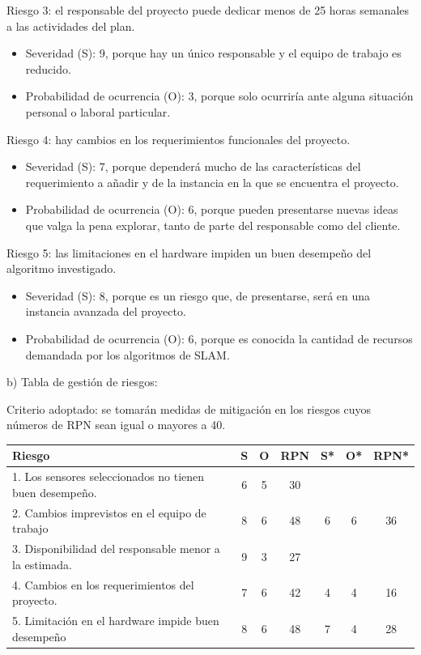 \documentclass[
11pt, %
codirector, %
]{charter}
\begin{document}
Riesgo 3: el responsable del proyecto puede dedicar menos de 25 horas semanales a las actividades del plan.
\begin{itemize}
	\item Severidad (S): 9, porque hay un único responsable y el equipo de trabajo es reducido.
	\item Probabilidad de ocurrencia (O): 3, porque solo ocurriría ante alguna situación personal o laboral particular.
\end{itemize}

Riesgo 4: hay cambios en los requerimientos funcionales del proyecto.
\begin{itemize}
	\item Severidad (S): 7, porque dependerá mucho de las características del requerimiento a añadir y de la instancia en la que se encuentra el proyecto.
	\item Probabilidad de ocurrencia (O): 6, porque pueden presentarse nuevas ideas que valga la pena explorar, tanto de parte del responsable como del cliente.
\end{itemize}

Riesgo 5: las limitaciones en el hardware impiden un buen desempeño del algoritmo investigado.
\begin{itemize}
	\item Severidad (S): 8, porque es un riesgo que, de presentarse, será en una instancia avanzada del proyecto.
	\item Probabilidad de ocurrencia (O): 6, porque es conocida la cantidad de recursos demandada por los algoritmos de SLAM.
\end{itemize}

b) Tabla de gestión de riesgos:

Criterio adoptado: se tomarán medidas de mitigación en los riesgos cuyos números de RPN sean igual o mayores a 40.
\begin{table}[htpb]
\centering
\begin{tabularx}{\linewidth}{@{}|X|c|c|c|c|c|c|@{}}
\hline
\rowcolor[HTML]{C0C0C0} 
Riesgo 													& S & O & RPN & S* & O* & RPN*  \\ \hline
1. Los sensores seleccionados no tienen buen desempeño. & 6 & 5 & 30  &   &     &  		\\ \hline
2. Cambios imprevistos en el equipo de trabajo       	& 8 & 6 & 48  & 6 & 6   & 36  	\\ \hline
3. Disponibilidad del responsable menor a la estimada.  & 9 & 3 & 27  &   &     &   	\\ \hline
4. Cambios en los requerimientos del proyecto.     		& 7 & 6 & 42 & 4  & 4   & 16  	\\ \hline
5. Limitación en el hardware impide buen desempeño     	& 8 & 6 & 48 & 7  & 4   & 28  	\\ \hline
\end{tabularx}%
\end{table}
\end{document}

